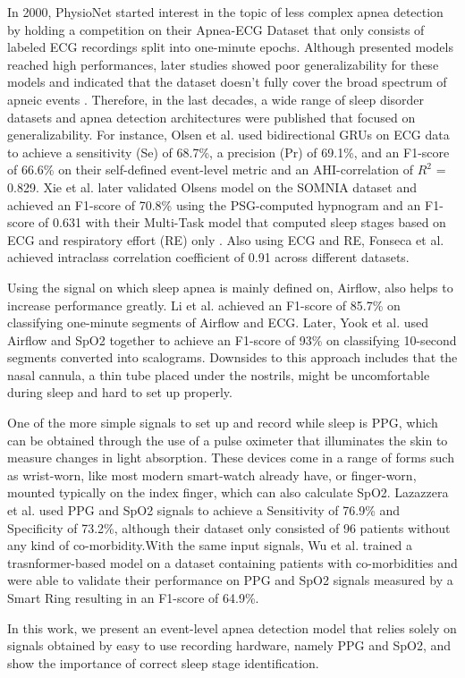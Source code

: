 In 2000, PhysioNet started interest in the topic of less complex apnea detection by holding a competition on their Apnea-ECG Dataset that only consists of labeled ECG recordings split into one-minute epochs. Although presented models reached high performances, later studies showed poor generalizability for these models and indicated that the dataset doesn't fully cover the broad spectrum of apneic events \cite{papini2018generalizability}. Therefore, in the last decades, a wide range of sleep disorder datasets and apnea detection architectures were published that focused on generalizability.
For instance, Olsen et al. \cite{olsen2020robust} used bidirectional GRUs on ECG data to achieve a sensitivity (Se) of 68.7\%, a precision (Pr) of 69.1\%, and an F1-score of 66.6\% on their self-defined event-level metric and an AHI-correlation of $R^2$ = 0.829. Xie et al. \cite{xie2023use} later validated Olsens model on the SOMNIA dataset and achieved an F1-score of 70.8\% using the PSG-computed hypnogram and an F1-score of 0.631 with their Multi-Task model that computed sleep stages based on ECG and respiratory effort (RE) only \cite{xie2024multi}. Also using  ECG and RE, Fonseca et al. \cite{fonseca2024estimating} achieved intraclass correlation coefficient of 0.91 across different datasets.

Using the signal on which sleep apnea is mainly defined on, Airflow, also helps to increase performance greatly. Li et al. \cite{li2023deep} achieved an F1-score of 85.7\% on classifying one-minute segments of Airflow and ECG. Later, Yook et al. \cite{yook2024deep} used Airflow and SpO2 together to achieve an F1-score of 93\% on classifying 10-second segments converted into scalograms.
Downsides to this approach includes that the nasal cannula, a thin tube placed under the nostrils, might be uncomfortable during sleep and hard to set up properly.

One of the more simple signals to set up and record while sleep is PPG, which can be obtained through the use of a pulse oximeter that illuminates the skin to measure changes in light absorption.
These devices come in a range of forms such as wrist-worn, like most modern smart-watch already have, or finger-worn, mounted typically on the index finger, which can also calculate SpO2.
Lazazzera et al. \cite {lazazzera2020detection} used PPG and SpO2 signals to achieve a Sensitivity of 76.9\% and Specificity of 73.2\%, although their dataset only consisted of 96 patients without any kind of co-morbidity.With the same input signals, Wu et al. \cite{wu2024transformer} trained a trasnformer-based model on a dataset containing patients with co-morbidities and were able to validate their performance on PPG and SpO2 signals measured by a Smart Ring resulting in an F1-score of 64.9\%.

In this work, we present an event-level apnea detection model that relies solely on signals obtained by easy to use recording hardware, namely PPG and SpO2, and show the importance of correct sleep stage identification.
